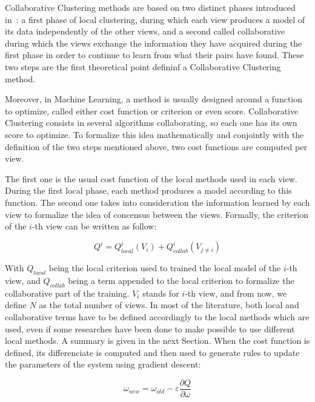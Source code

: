 \documentclass[a4paper]{report}
\begin{document}
    Collaborative Clustering methods are based on two distinct phases introduced in~\cite{pedrycz2002collaborative}: a first phase of local clustering, during which each view produces a model of its data independently of the other views, and a second called collaborative during which the views exchange the information they have acquired during the first phase in order to continue to learn from what their pairs have found. These two steps are the first theoretical point defininf a Collaborative Clustering method.

    Moreover, in Machine Learning, a method is usually designed around a function to optimize, called either cost function or criterion or even score. Collaborative Clustering consists in several algorithms collaborating, so each one has its own score to optimize. To formalize this idea mathematically and conjointly with the definition of the two steps mentioned above, two cost functions are computed per view.

    The first one is the usual cost function of the local methods used in each view. During the first local phase, each method produces a model according to this function. The second one takes into consideration the information learned by each view to formalize the idea of concensus between the views. Formally, the criterion of the $i$-th view can be written as follow:

    \begin{equation}
        Q^i = Q^i_{local}(V_i) + Q^i_{collab}(V_{j\neq i})
    \end{equation}

    With $Q_{local}$ being the local criterion used to trained the local model of the $i$-th view, and $Q_{collab}$ being a term appended to the local criterion to formalize the collaborative part of the training. $V_i$ stands for $i$-th view, and from now, we define $N$ as the total number of views. In most of the literature, both local and collaborative terms have to be defined accordingly to the local methods which are used, even if some researches have been done to make possible to use different local methods. A summary is given in the next Section. When the cost function is defined, its differenciate is computed and then used to generate rules to update the parameters of the system using gradient descent: 
    
    \begin{equation}
        \omega_{new} = \omega_{old} - \varepsilon \frac{\partial Q}{\partial \omega}
        \label{eq:gradient_descent}
    \end{equation}
    
\end{document}
